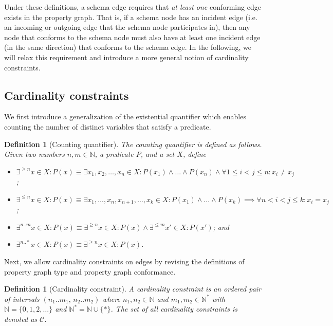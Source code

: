 \documentclass[a4paper]{article}
\newtheorem{definition}[theorem]{Definition}
\newcommand{\N}{\mathbb{N}}
\begin{document}
Under these definitions, a schema edge requires that \emph{at least one} conforming edge exists in the property graph. That is, if a schema node has an incident edge (i.e. an incoming or outgoing edge that the schema node participates in), then any node that conforms to the schema node must also have at least one incident edge (in the same direction) that conforms to the schema edge. In the following, we will relax this requirement and introduce a more general notion of cardinality constraints.

\subsection{Cardinality constraints}

We first introduce a generalization of the existential quantifier which enables counting the number of distinct variables that satisfy a predicate.

\begin{definition}[Counting quantifier]
  The \emph{counting quantifier} is defined as follows. Given two numbers $n, m \in \N$, a predicate $P$, and a set $X$, define
  \begin{itemize}
    \item $\exists^{\geq n} x \in X : P(x) \equiv \exists x_1, x_2, \ldots, x_n \in X : P(x_1) \wedge \ldots \wedge P(x_n) \wedge \forall 1 \leq i < j \leq n : x_i \neq x_j$;
    \item $\exists^{\leq n} x \in X : P(x) \equiv \exists x_1, \ldots, x_n, x_{n+1}, \ldots, x_k \in X : P(x_1) \wedge \ldots \wedge P(x_k) \implies \forall n < i < j \leq k : x_i = x_j$;
    \item $\exists^{n..m} x \in X : P(x) \equiv \exists^{\geq n} x \in X : P(x) \wedge \exists^{\leq m} x' \in X : P(x')$; and
    \item $\exists^{n..*} x \in X : P(x) \equiv \exists^{\geq n} x \in X : P(x)$.
  \end{itemize}
\end{definition}

Next, we allow cardinality constraints on edges by revising the definitions of property graph type and property graph conformance.

\begin{definition}[Cardinality constraint]
  A \emph{cardinality constraint} is an ordered pair of intervals $(n_1..m_1, \, n_2..m_2)$ where $n_1, n_2 \in \N$ and $m_1, m_2 \in \N^*$ with $\N = \{0, 1, 2, \ldots\}$ and $\N^* = \N \cup \{*\}$. The set of all cardinality constraints is denoted as $\mathcal{C}$.
\end{definition}
\end{document}
